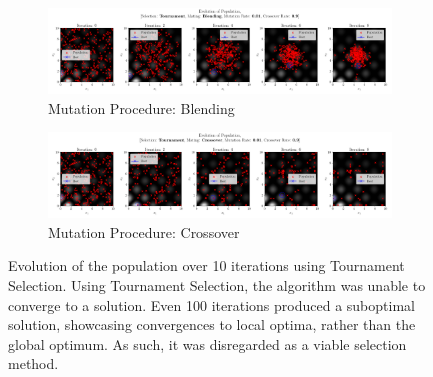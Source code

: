 \documentclass[10pt]{article}
\begin{document}
\begin{figure}[H]
    \centering
    \begin{subfigure}{\textwidth}
        \centering
        \includegraphics[width=\textwidth]{../figures/KBF/10_iters/Tournament/Blending/0.01_0.9_Population.png}
        \caption{Mutation Procedure: Blending}
        \label{fig:CGA_flowchart_tournament_blending}
    \end{subfigure}
    \begin{subfigure}{\textwidth}
        \centering
        \includegraphics[width=\textwidth]{../figures/KBF/10_iters/Tournament/Crossover/0.01_0.9_Population.png}
        \caption{Mutation Procedure: Crossover}
        \label{fig:CGA_flowchart_tournament_crossover}
    \end{subfigure}
    \captionsetup{justification=centering}
    \caption{Evolution of the population over 10 iterations using Tournament Selection. Using Tournament Selection, the algorithm was unable to converge to a solution. Even 100 iterations produced a suboptimal solution, showcasing convergences to local optima, rather than the global optimum. As such, it was disregarded as a viable selection method.}
    \label{fig:CGA_flowchart_tournament}
\end{figure}
\end{document}
